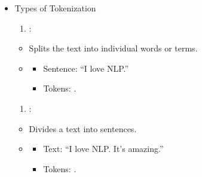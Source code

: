 \documentclass[letterpaper,11pt,english]{sphinxmanual}
\begin{document}
\begin{itemize}
\item {} 
\sphinxAtStartPar
Types of Tokenization
\begin{enumerate}
%
\item {} 
\sphinxAtStartPar
{}:

\end{enumerate}
\begin{itemize}
\item {} 
\sphinxAtStartPar
Splits the text into individual words or terms.

\item {} \begin{description}
\begin{itemize}
\item {} 
\sphinxAtStartPar
Sentence: “I love NLP.”

\item {} 
\sphinxAtStartPar
Tokens: .

\end{itemize}

\end{description}

\end{itemize}
\begin{enumerate}
%
\setcounter{enumi}{1}
\item {} 
\sphinxAtStartPar
{}:

\end{enumerate}
\begin{itemize}
\item {} 
\sphinxAtStartPar
Divides a text into sentences.

\item {} \begin{description}
\begin{itemize}
\item {} 
\sphinxAtStartPar
Text: “I love NLP. It’s amazing.”

\item {} 
\sphinxAtStartPar
Tokens: .

\end{itemize}

\end{description}


\end{itemize}
\end{itemize}
\end{document}
